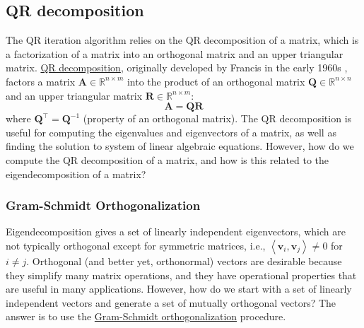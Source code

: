 \documentclass{article}[11pt]
\begin{document}
\subsection{QR decomposition}
The QR iteration algorithm relies on the QR decomposition of a matrix, which is a factorization of a matrix into an orthogonal matrix and an upper triangular matrix.
\href{https://en.wikipedia.org/wiki/QR_decomposition}{QR decomposition}, originally developed by Francis in the early 1960s \cite{Francis-QR-1961, Francis-QR-1962}, factors a matrix $\mathbf{A}\in\mathbb{R}^{n\times{m}}$ 
into the product of an orthogonal matrix $\mathbf{Q}\in\mathbb{R}^{n\times{n}}$ and 
an upper triangular matrix $\mathbf{R}\in\mathbb{R}^{n\times{m}}$:
\begin{equation}
\mathbf{A} = \mathbf{Q}\mathbf{R}
\end{equation}
where $\mathbf{Q}^{\top} = \mathbf{Q}^{-1}$ (property of an orthogonal matrix). 
The QR decomposition is useful for computing the eigenvalues and eigenvectors of a matrix, as well as finding the solution to system of linear algebraic equations.
However, how do we compute the QR decomposition of a matrix, and how is this related to the eigendecomposition of a matrix?

\subsubsection*{Gram-Schmidt Orthogonalization}
Eigendecomposition gives a set of linearly independent eigenvectors, which are not typically orthogonal except for symmetric matrices, i.e., $\left<\mathbf{v}_{i},\mathbf{v}_{j}\right>\neq{0}$ for $i\neq{j}$.
Orthogonal (and better yet, orthonormal) vectors are desirable because they simplify many matrix operations, 
and they have operational properties that are useful in many applications. 
However, how do we start with a set of linearly independent vectors and generate a set of mutually orthogonal vectors?
The answer is to use the \href{https://en.wikipedia.org/wiki/Gram-Schmidt_process}{Gram-Schmidt orthogonalization} procedure. 
\end{document}
